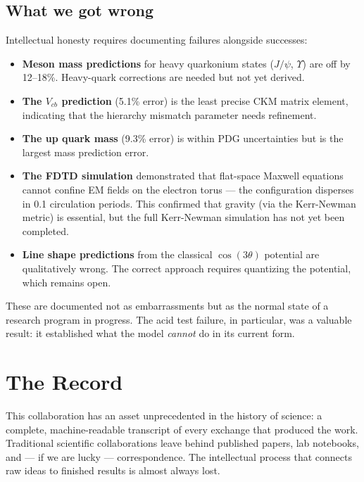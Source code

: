 \documentclass[11pt,a4paper]{article}
\begin{document}
\subsection{What we got wrong}

Intellectual honesty requires documenting failures alongside successes:

\begin{itemize}
  \item \textbf{Meson mass predictions} for heavy quarkonium states ($J/\psi$, $\Upsilon$) are off by 12--18\%. Heavy-quark corrections are needed but not yet derived.
  \item \textbf{The $V_{cb}$ prediction} (5.1\% error) is the least precise CKM matrix element, indicating that the hierarchy mismatch parameter needs refinement.
  \item \textbf{The up quark mass} (9.3\% error) is within PDG uncertainties but is the largest mass prediction error.
  \item \textbf{The FDTD simulation} demonstrated that flat-space Maxwell equations cannot confine EM fields on the electron torus --- the configuration disperses in 0.1 circulation periods. This confirmed that gravity (via the Kerr-Newman metric) is essential, but the full Kerr-Newman simulation has not yet been completed.
  \item \textbf{Line shape predictions} from the classical $\cos(3\theta)$ potential are qualitatively wrong. The correct approach requires quantizing the potential, which remains open.
\end{itemize}

These are documented not as embarrassments but as the normal state of a research program in progress. The acid test failure, in particular, was a valuable result: it established what the model \emph{cannot} do in its current form.

\section{The Record}
\label{sec:record}

This collaboration has an asset unprecedented in the history of science: a complete, machine-readable transcript of every exchange that produced the work. Traditional scientific collaborations leave behind published papers, lab notebooks, and --- if we are lucky --- correspondence. The intellectual process that connects raw ideas to finished results is almost always lost.
\end{document}
